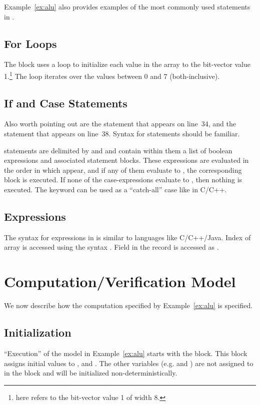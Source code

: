 Example~\ref{ex:alu} also provides examples of the most commonly used statements in \uclid{}. 

\subsection{For Loops}
The  block uses a  loop to initialize each value in the array  to the bit-vector value 1.\footnote{ here refers to the bit-vector value 1 of width 8.} The loop iterates over the values between 0 and 7 (both-inclusive). 

\subsection{If and Case Statements}
Also worth pointing out are the  statement that appears on line~34, and the  statement that appears on line~38. Syntax for  statements should be familiar. 

 statements are delimited by  and  and contain within them a list of boolean expressions and associated statement blocks. These expressions are evaluated in the order in which appear, and if any of them evaluate to , the corresponding block is executed. If none of the case-expressions evaluate to , then nothing is executed. The keyword  can be used as a ``catch-all'' case like in C/C++. 

\subsection{Expressions}

The syntax for expressions in \uclid{} is similar to languages like C/C++/Java. Index  of array  is accessed using the syntax . Field  in the record  is accessed as . 

\section{Computation/Verification Model}
We now describe how the computation specified by Example~\ref{ex:alu} is specified.

\subsection{Initialization}
``Execution'' of the model in Example~\ref{ex:alu} starts with the  block. This block assigns initial values to ,  and . The other variables (e.g.  and ) are not assigned to in the  block and will be initialized non-deterministically.

